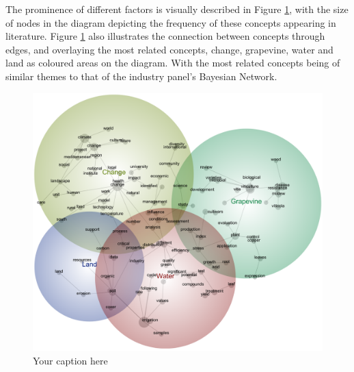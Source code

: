 The prominence of different factors is visually described in Figure \ref{fig:lexi}, with the size of nodes in the diagram depicting the frequency of these concepts appearing in literature. Figure \ref{fig:lexi} also illustrates the connection between concepts through edges, and overlaying the most related concepts, change, grapevine, water and land as coloured areas on the diagram. With the most related concepts being of similar themes to that of the industry panel's Bayesian Network.

\begin{figure}[h]
    \centering
    \includegraphics[width=\linewidth]{Winegrowing-concept-map}
    \caption{Your caption here}
    \label{fig:lexi}
\end{figure}

